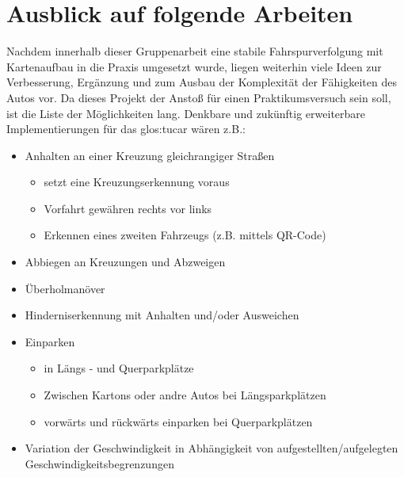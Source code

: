 \chapter{Ausblick auf folgende Arbeiten \dcfirstauthorshort}
\label{cha:ausblick}

Nachdem innerhalb dieser Gruppenarbeit eine stabile Fahrspurverfolgung mit Kartenaufbau in die Praxis umgesetzt wurde, liegen weiterhin viele Ideen zur Verbesserung, Ergänzung und zum Ausbau der Komplexität der Fähigkeiten des Autos vor. Da dieses Projekt der Anstoß für einen Praktikumsversuch sein soll, ist die Liste der Möglichkeiten lang. Denkbare und zukünftig erweiterbare Implementierungen für das \gls{glos:tucar} wären z.B.:

\begin{itemize}
\item Anhalten an einer Kreuzung gleichrangiger Straßen
	\begin{itemize}
	\item setzt eine Kreuzungserkennung voraus
	\item Vorfahrt gewähren \glqq rechts vor links\grqq
	\item Erkennen eines zweiten Fahrzeugs (z.B. mittels QR-Code)
	\end{itemize}
\item Abbiegen an Kreuzungen und Abzweigen
\item Überholmanöver
\item Hinderniserkennung mit Anhalten und/oder Ausweichen 
\item Einparken
	\begin{itemize}
	\item in Längs - und Querparkplätze
	\item Zwischen Kartons oder andre Autos bei Längsparkplätzen
	\item vorwärts und rückwärts einparken bei Querparkplätzen
	\end{itemize}
\item Variation der Geschwindigkeit in Abhängigkeit von aufgestellten/aufgelegten Geschwindigkeitsbegrenzungen
\end{itemize}
